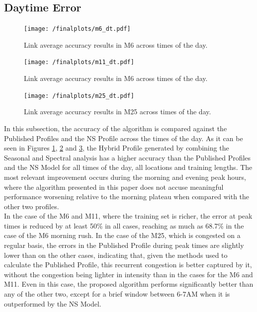 \documentclass[conference, letterpaper]{IEEEtran}
\begin{document}
\subsection{Daytime Error}
\begin{figure}[htbp]
	\centering
		\texttt{[image: /finalplots/m6\_dt.pdf]}
	\caption{Link average accuracy results in M6 across times of the day.}
	\label{fig:m6daytime}
\end{figure}

\begin{figure}[htbp]
	\centering
	\texttt{[image: /finalplots/m11\_dt.pdf]}
	\caption{Link average accuracy results in M6 across times of the day.}
	\label{fig:m11daytime}
\end{figure}

\begin{figure}[htbp]
	\centering
	\texttt{[image: /finalplots/m25\_dt.pdf]}
	\caption{Link average accuracy results in M25 across times of the day.}
	\label{fig:m25daytime}
\end{figure}

In this subsection, the accuracy of the algorithm is compared against the Published Profiles and the NS Profile across the times of the day.
As it can be seen in Figures \ref{fig:m6daytime}, \ref{fig:m11daytime} and \ref{fig:m25daytime}, the Hybrid Profile generated by combining the Seasonal and Spectral analysis has a higher accuracy than the Published Profiles and the NS Model for all times of the day, all locations and training lengths. 
The most relevant improvement occurs during the morning and evening peak hours, where the algorithm presented in this paper does not accuse meaningful performance worsening relative to the morning plateau when compared with the other two profiles.\\
In the case of the M6 and M11, where the training set is richer, the error at peak times is reduced by at least 50\% in all cases, reaching as much as 68.7\% in the case of the M6 morning rush.
In the case of the M25, which is congested on a regular basis, the errors in the Published Profile during peak times are slightly lower than on the other cases, indicating that, given the methods used to calculate the Published Profile, this recurrent congestion is better captured by it, without the congestion being lighter in intensity than in the cases for the M6 and M11. 
Even in this case, the proposed algorithm performs significantly better than any of the other two, except for a brief window between 6-7AM when it is outperformed by the NS Model.
\end{document}
